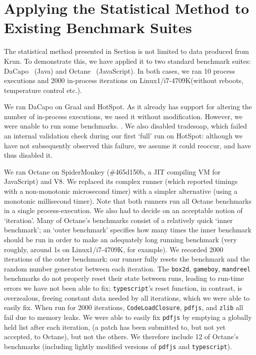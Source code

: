 \documentclass[preprint,numbers,10pt]{sigplanconf}
\newcommand{\bencherthree}{Linux1/i7-4709K\xspace}
\begin{document}
\section{Applying the Statistical Method to Existing Benchmark Suites}
\label{sec:existing}

The statistical method presented in Section  is not limited to data
produced from Krun. To demonstrate this, we have applied it to two standard
benchmark suites: DaCapo~\cite{dacapo06} (Java) and Octane~
(JavaScript). In both cases, we ran 10 process executions and 2000 in-process
iterations on \bencherthree (without reboots, temperature control etc.).

We ran DaCapo on Graal and HotSpot. As it already has support for
altering the number of in-process executions, we used it without modification.
However, we were unable to run some benchmarks. . We also disabled tradesoap, which
failed an internal validation check during our first `full' run on HotSpot:
although we have not subsequently observed this failure, we assume it could
reoccur, and have thus disabled it.

We ran Octane on SpiderMonkey (\#465d150b, a JIT compiling VM for JavaScript) and V8. 
We replaced its complex runner (which reported timings with a non-monotonic
microsecond timer) with a simpler alternative (using a monotonic millisecond
timer). Note that both runners run all Octane benchmarks in a single process-execution.
We also had to decide on an acceptable notion of `iteration'. Many of Octane's
benchmarks consist of a relatively quick `inner benchmark'; an `outer benchmark'
specifies how many times the inner benchmark should be run in order to make an
adequately long running benchmark (very roughly, around 1s on \bencherthree, for
example). We recorded 2000 iterations of the outer benchmark; our runner
fully resets the benchmark and the random number generator between each
iteration. The \texttt{box2d}, \texttt{gameboy}, \texttt{mandreel} benchmarks do
not properly reset their state between runs, leading to run-time errors we have
not been able to fix; \texttt{typescript}'s reset function, in contrast, is
overzealous, freeing constant data needed by all iterations, which we were able
to easily fix. When run for 2000 iterations, \texttt{CodeLoadClosure},
\texttt{pdfjs}, and \texttt{zlib} all fail due to memory leaks. We were able to
easily fix \texttt{pdfjs} by emptying a globally held list after each iteration,
(a patch has been submitted to, but not yet accepted, to Octane), but not the
others. We therefore include 12 of Octane's benchmarks (including lightly
modified versions of \texttt{pdfjs} and \texttt{typescript}).
\end{document}
